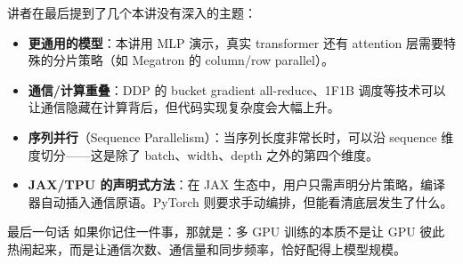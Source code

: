 讲者在最后提到了几个本讲没有深入的主题：

\begin{itemize}
    \item \textbf{更通用的模型}：本讲用 MLP 演示，真实 transformer 还有 attention 层需要特殊的分片策略（如 Megatron 的 column/row parallel）。
    \item \textbf{通信/计算重叠}：DDP 的 bucket gradient all-reduce、1F1B 调度等技术可以让通信隐藏在计算背后，但代码实现复杂度会大幅上升。
    \item \textbf{序列并行}（Sequence Parallelism）：当序列长度非常长时，可以沿 sequence 维度切分——这是除了 batch、width、depth 之外的第四个维度。
    \item \textbf{JAX/TPU 的声明式方法}：在 JAX 生态中，用户只需声明分片策略，编译器自动插入通信原语。PyTorch 则要求手动编排，但能看清底层发生了什么。
\end{itemize}

\begin{knowledgebox}{最后一句话}
如果你记住一件事，那就是：多 GPU 训练的本质不是让 GPU 彼此热闹起来，而是让通信次数、通信量和同步频率，恰好配得上模型规模。
\end{knowledgebox}

